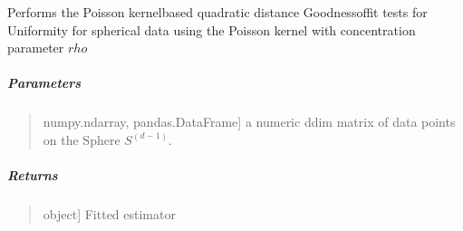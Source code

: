 \documentclass[letterpaper,10pt,english,openany,oneside]{sphinxmanual}
\begin{document}
{{{{\begin{fulllineitems}
\begin{quote}
\begin{description}
\end{description}
\end{quote}

\end{fulllineitems}


\begin{fulllineitems}
\label{\detokenize{api_reference/generated/QuadratiK.poisson_kernel_test.PoissonKernelTest:QuadratiK.poisson_kernel_test.PoissonKernelTest.test}}
\pysigstartsignatures
{}
\pysigstopsignatures
\sphinxAtStartPar
Performs the Poisson kernel\sphinxhyphen{}based quadratic distance Goodness\sphinxhyphen{}of\sphinxhyphen{}fit tests for
Uniformity for spherical data using the Poisson kernel with concentration parameter \(rho\)


\subparagraph{Parameters}
\label{\detokenize{api_reference/generated/QuadratiK.poisson_kernel_test.PoissonKernelTest:id3}}\begin{quote}
\begin{description}
\sphinxlineitem{x}{[}numpy.ndarray, pandas.DataFrame{]}
\sphinxAtStartPar
a numeric d\sphinxhyphen{}dim matrix of data points on the Sphere \(S^{(d-1)}\).

\end{description}
\end{quote}


\subparagraph{Returns}
\label{\detokenize{api_reference/generated/QuadratiK.poisson_kernel_test.PoissonKernelTest:id4}}\begin{quote}
\begin{description}
\sphinxlineitem{self}{[}object{]}
\sphinxAtStartPar
Fitted estimator

\end{description}
\end{quote}

\end{fulllineitems}




}}}}
\end{document}
